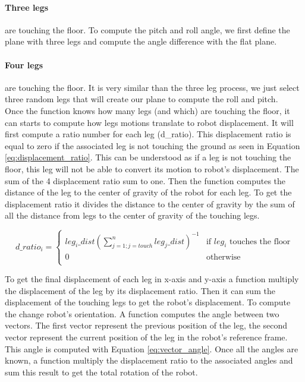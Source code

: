             \paragraph{Three legs} are touching the floor. To compute the pitch and roll angle, we first define the plane with three legs and compute the angle difference with the flat plane. 
            \paragraph{Four legs} are touching the floor. It is very similar than the three leg process, we just select three random legs that will create our plane to compute the roll and pitch.
            \\
            
            Once the function knows how many legs (and which) are touching the floor, it can starts to compute how legs motions translate to robot displacement. It will first compute a ratio number for each leg (d\_ratio). This displacement ratio is equal to zero if the associated leg is not touching the ground as seen in Equation \ref{eq:displacement_ratio}. This can be understood as if a leg is not touching the floor, this leg will not be able to convert its motion to robot's displacement. The sum of the 4 displacement ratio sum to one. Then the function computes the distance of the leg to the center of gravity of the robot for each leg. To get the displacement ratio it divides the distance to the center of gravity by the sum of all the distance from legs to the center of gravity of the touching legs.

            \begin{equation}
                d\_ratio_i = 
                \begin{cases}
                  leg_i\_dist \left(\sum_{j=1;j=touch}^{n}leg_j\_dist\right)^{-1} & \text{if $leg_i$ touches the floor}\\
                  0 & \text{otherwise}\\
                \end{cases}  
                \label{eq:displacement_ratio}
            \end{equation}
            
            To get the final displacement of each leg in x-axis and y-axis a function multiply the displacement of the leg by its displacement ratio. Then it can sum the displacement of the touching legs to get the robot's displacement.
            To compute the change robot's orientation. A function computes the angle between two vectors. The first vector represent the previous position of the leg, the second vector represent the current position of the leg in the robot's reference frame. This angle is computed with Equation \ref{eq:vector_angle}. Once all the angles are known, a function multiply the displacement ratio to the associated angles and sum this result to get the total rotation of the robot.

